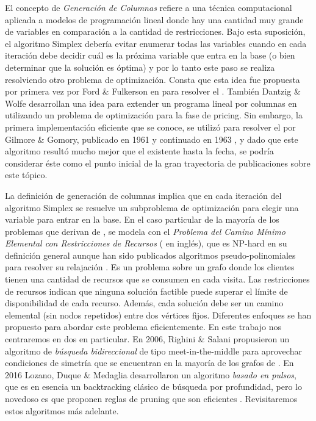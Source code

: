 El concepto de \emph{Generación de Columnas} refiere a una técnica computacional aplicada a modelos de programación lineal donde hay una cantidad muy grande de variables en comparación a la cantidad de restricciones. Bajo esta suposición, el algoritmo Simplex debería evitar enumerar todas las variables cuando en cada iteración debe decidir cuál es la próxima variable que entra en la base (o bien determinar que la solución es óptima) y por lo tanto este paso se realiza resolviendo otro problema de optimización. Consta que esta idea fue propuesta por primera vez por Ford \& Fulkerson en \cite{ford-fulkerson} para resolver el . También Dantzig \& Wolfe desarrollan una idea para extender un programa lineal por columnas en \cite{dantzig-wolfe} utilizando un problema de optimización para la fase de pricing. Sin embargo, la primera implementación eficiente que se conoce, se utilizó para resolver el  por Gilmore \& Gomory, publicado en 1961 \cite{gilmore-gomory1} y continuado en 1963 \cite{gilmore-gomory2}, y dado que este algoritmo resultó mucho mejor que el existente hasta la fecha, se podría considerar éste como el punto inicial de la gran trayectoria de publicaciones sobre este tópico. 

La definición de generación de columnas implica que en cada iteración del algoritmo Simplex se resuelve un subproblema de optimización para elegir una variable para entrar en la base. En el caso particular de la mayoría de los problemas que derivan de , se modela con el \emph{Problema del Camino Mínimo Elemental con Restricciones de Recursos} ( en inglés), que es NP-hard en su definición general aunque han sido publicados algoritmos pseudo-polinomiales para resolver su relajación \cite{christo-et-al}. Es un problema sobre un grafo donde los clientes tienen una cantidad de recursos que se consumen en cada visita. Las restricciones de recursos indican que ninguna solución factible puede superar el límite de disponibilidad de cada recurso. Además, cada solución debe ser un camino elemental (sin nodos repetidos) entre dos vértices fijos. Diferentes enfoques se han propuesto para abordar este problema eficientemente. En este trabajo nos centraremos en dos en particular. En 2006, Righini \& Salani propusieron un algoritmo de \emph{búsqueda bidireccional} de tipo meet-in-the-middle para aprovechar condiciones de simetría que se encuentran en la mayoría de los grafos de  \cite{righini-salani}. En 2016 Lozano, Duque \& Medaglia desarrollaron un algoritmo \emph{basado en pulsos}, que es en esencia un backtracking clásico de búsqueda por profundidad, pero lo novedoso es que proponen reglas de pruning que son eficientes \cite{lozano-duque-medaglia}. Revisitaremos estos algoritmos más adelante.

